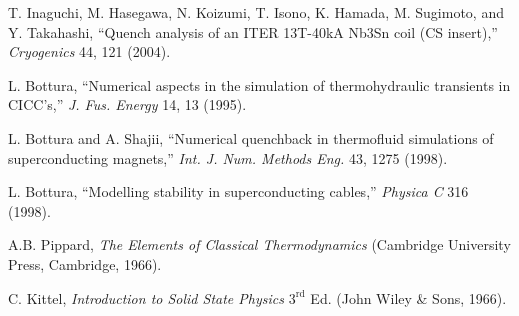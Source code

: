 \noindent [1.21] T. Inaguchi, M. Hasegawa, N. Koizumi, T. Isono, K. Hamada, M. Sugimoto, and
Y. Takahashi, ``Quench analysis of an ITER 13T-40kA Nb3Sn coil (CS insert),”
\textit{Cryogenics} 44, 121 (2004).

\noindent [1.22] L. Bottura, ``Numerical aspects in the simulation of thermohydraulic transients
in CICC’s,” \textit{J. Fus. Energy} 14, 13 (1995).

\noindent [1.23] L. Bottura and A. Shajii, ``Numerical quenchback in thermofluid simulations of
superconducting magnets,” \textit{Int. J. Num. Methods Eng.} 43, 1275 (1998).

\noindent [1.24] L. Bottura, ``Modelling stability in superconducting cables,” \textit{Physica C} 316 (1998).

\noindent [1.25] A.B. Pippard, \textit{The Elements of Classical Thermodynamics} (Cambridge University
Press, Cambridge, 1966).

\noindent [1.26] C. Kittel, \textit{Introduction to Solid State Physics} $\mathrm{3^{rd}}$ Ed. (John Wiley \& Sons, 1966).


